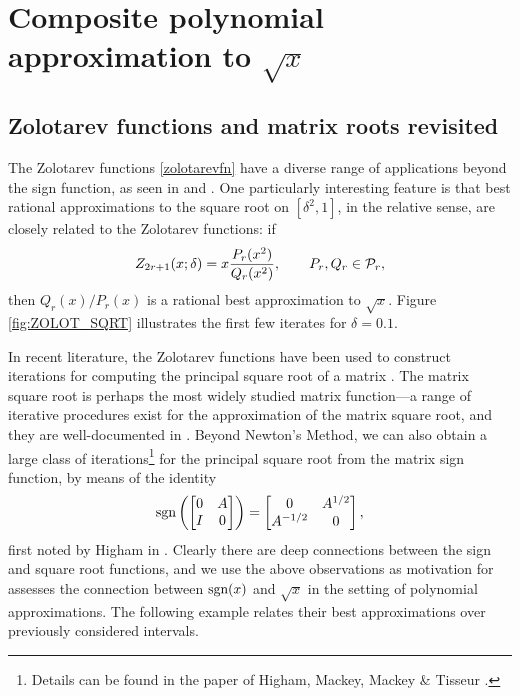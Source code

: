 \chapter{Composite polynomial approximation to \texorpdfstring{$\sqrt{x}$}{sqrt(x)}} \label{sqrtchapter}

\section{Zolotarev functions and matrix roots revisited}

The Zolotarev functions \eqref{zolotarevfn} have a diverse range of applications beyond the sign function, as seen in \cite[Section 3.7]{YujiZolotFreund} and \cite[Chapter 9]{akhiezer}. One particularly interesting feature is that best rational approximations to the square root on $[\delta^2,1]$, in the relative sense, are closely related to the Zolotarev functions: if
\[Z_{2r+1}(x;\delta) = x\dfrac{P_r(x^2)}{Q_r(x^2)}, \qquad P_r, Q_r \in \mathcal{P}_r,\]
then $Q_r(x)/P_r(x)$ is a rational best approximation to $\sqrt{x}$. Figure \ref{fig:ZOLOT_SQRT} illustrates the first few iterates for $\delta=0.1$. 

\bigskip{}

In recent literature, the Zolotarev functions have been used to construct iterations for computing the principal square root of a matrix \cite{Gawlik,ZolotGawlik}. The matrix square root is perhaps the most widely studied matrix function---a range of iterative procedures exist for the approximation of the matrix square root, and they are well-documented in \cite[Section 6.3]{Higham}. Beyond Newton's Method, we can also obtain a large class of iterations\footnote{Details can be found in the paper of Higham, Mackey, Mackey \& Tisseur \cite[Theorem 4.5]{highamgroups}.} for the principal square root from the matrix sign function, by means of the identity
\[\text{sgn}\left(\begin{bmatrix} 0 & A \\ I & 0 \end{bmatrix}\right)=\begin{bmatrix} 0 & A^{1/2} \\ A^{-1/2} & 0 \end{bmatrix},\]
first noted by Higham in \cite{HighamStable}. Clearly there are deep connections between the sign and square root functions, and we use the above observations as motivation for assesses the connection between $\text{sgn}(x)$ and $\sqrt{x}$ in the setting of polynomial approximations. The following example relates their best approximations over previously considered intervals.

